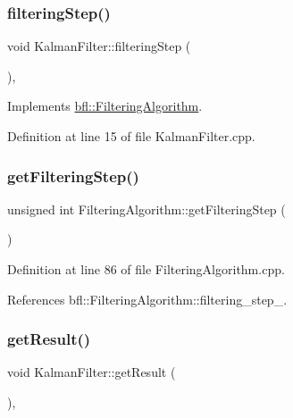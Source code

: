 \subsubsection{\texorpdfstring{filtering\+Step()}{filteringStep()}}
{\footnotesize\ttfamily void Kalman\+Filter\+::filtering\+Step (\begin{DoxyParamCaption}{ }\end{DoxyParamCaption})\hspace{0.3cm}{\ttfamily [override]}, {\ttfamily [virtual]}}



Implements \mbox{\hyperlink{classbfl_1_1FilteringAlgorithm_ab3bceb43b5810a4bf1da884b8a0b145a}{bfl\+::\+Filtering\+Algorithm}}.



Definition at line 15 of file Kalman\+Filter.\+cpp.

\mbox{\label{classbfl_1_1FilteringAlgorithm_a8c43b1f3dac30934c0a03de348d4a29d}} 
\subsubsection{\texorpdfstring{get\+Filtering\+Step()}{getFilteringStep()}}
{\footnotesize\ttfamily unsigned int Filtering\+Algorithm\+::get\+Filtering\+Step (\begin{DoxyParamCaption}{ }\end{DoxyParamCaption})\hspace{0.3cm}{\ttfamily [inherited]}}



Definition at line 86 of file Filtering\+Algorithm.\+cpp.



References bfl\+::\+Filtering\+Algorithm\+::filtering\+\_\+step\+\_\+.

\mbox{\label{classbfl_1_1KalmanFilter_a24484fb845495f43628db19062937548}} 
\subsubsection{\texorpdfstring{get\+Result()}{getResult()}}
{\footnotesize\ttfamily void Kalman\+Filter\+::get\+Result (\begin{DoxyParamCaption}{ }\end{DoxyParamCaption})\hspace{0.3cm}{\ttfamily [override]}, {\ttfamily [virtual]}}



